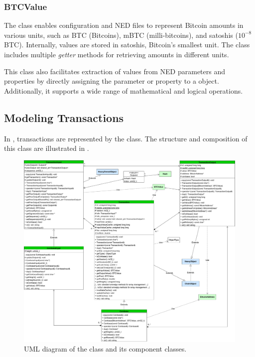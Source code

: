 \subsubsection{BTCValue}\label{subsubsec:impl-btcvalue}

The  class enables configuration and NED files to represent
Bitcoin amounts in various units, such as BTC (Bitcoins), mBTC
(milli-bitcoins), and satoshis (\(10^{-8}\) BTC). Internally, values are stored
in satoshis, Bitcoin's smallest unit. The class includes multiple \emph{getter}
methods for retrieving amounts in different units.

This class also facilitates extraction of values from NED parameters and
properties by directly assigning the parameter or property to a 
object. Additionally, it supports a wide range of mathematical and logical
operations.

\subsection{Modeling Transactions}\label{subsec:impl-transactions}

In \iblock{}, transactions are represented by the  class. The
structure and composition of this class are illustrated in
.

\begin{figure}[tbhp]
	\centering
	\includegraphics[width=\textwidth]{img/transaction-uml}
	\caption{UML diagram of the  class and its component
	classes.}\label{fig:transaction-uml}
\end{figure}

